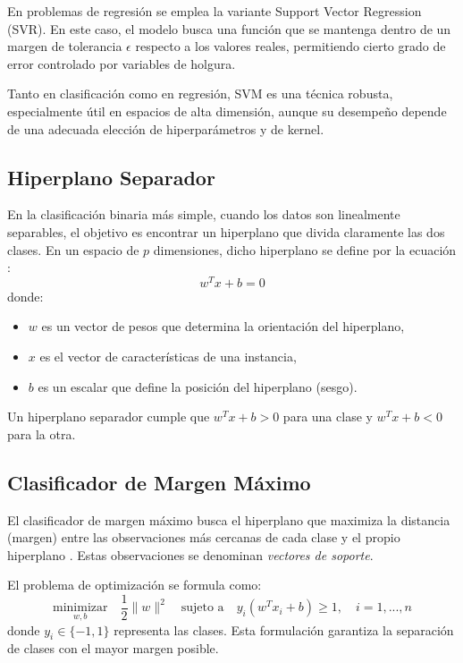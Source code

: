 	En problemas de regresión se emplea la variante Support Vector Regression (SVR). En este caso, el modelo busca una función que se mantenga dentro de un margen de tolerancia $\epsilon$ respecto a los valores reales, permitiendo cierto grado de error controlado por variables de holgura\citep{james2013}.
	
	Tanto en clasificación como en regresión, SVM es una técnica robusta, especialmente útil en espacios de alta dimensión, aunque su desempeño depende de una adecuada elección de hiperparámetros y de kernel.
	
	
	\subsection{Hiperplano Separador}
	
	En la clasificación binaria más simple, cuando los datos son linealmente separables, el objetivo es encontrar un hiperplano que divida claramente las dos clases. En un espacio de $p$ dimensiones, dicho hiperplano se define por la ecuación \citep{james2013}:
	\[
	w^T x + b = 0
	\]
	donde:
	\begin{itemize}
		\item $w$ es un vector de pesos que determina la orientación del hiperplano,
		\item $x$ es el vector de características de una instancia,
		\item $b$ es un escalar que define la posición del hiperplano (sesgo).
	\end{itemize}
	Un hiperplano separador cumple que $w^T x + b > 0$ para una clase y $w^T x + b < 0$ para la otra.
	
	\subsection{Clasificador de Margen Máximo}
	
	El clasificador de margen máximo busca el hiperplano que maximiza la distancia (margen) entre las observaciones más cercanas de cada clase y el propio hiperplano \citep{james2013}. Estas observaciones se denominan \textit{vectores de soporte}.
	
	El problema de optimización se formula como:
	\[
	\underset{w, b}{\text{minimizar}} \quad \frac{1}{2} \|w\|^2 \quad \text{sujeto a} \quad y_i(w^T x_i + b) \geq 1, \quad i = 1, ..., n
	\]
	donde $y_i \in \{-1, 1\}$ representa las clases. Esta formulación garantiza la separación de clases con el mayor margen posible.
	
